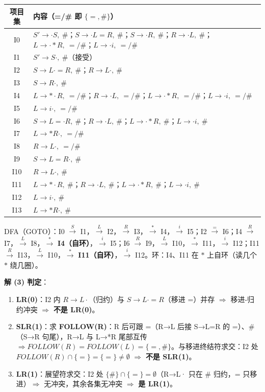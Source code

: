 \documentclass[12pt,a4paper,fontset=windows]{ctexart}
\newcommand{\imp}{\ensuremath{\Rightarrow}}
\begin{document}
\begin{center}
\renewcommand{\arraystretch}{1.25}
\begin{tabular}{c p{11.8cm}}
\toprule
\textbf{项目集} & \textbf{内容（=/\# 即 $\{=,\#\}$）} \\
\midrule
I0 & $S' \to \cdot S,\ \#$；$S \to \cdot L=R,\ \#$；$S \to \cdot R,\ \#$；$R \to \cdot L,\ \#$；$L \to \cdot *R,\ =/\#$；$L \to \cdot i,\ =/\#$ \\
I1 & $S' \to S\cdot,\ \#$（接受） \\
I2 & {\boldmath $S \to L\cdot =R,\ \#$}；{\boldmath $R \to L\cdot,\ \#$} \\
I3 & $S \to R\cdot,\ \#$ \\
I4 & $L \to *\cdot R,\ =/\#$；$R \to \cdot L,\ =/\#$；$L \to \cdot *R,\ =/\#$；$L \to \cdot i,\ =/\#$ \\
I5 & $L \to i\cdot,\ =/\#$ \\
I6 & $S \to L=\cdot R,\ \#$；$R \to \cdot L,\ \#$；$L \to \cdot *R,\ \#$；$L \to \cdot i,\ \#$ \\
I7 & $L \to *R\cdot,\ =/\#$ \\
I8 & $R \to L\cdot,\ =/\#$ \\
I9 & $S \to L=R\cdot,\ \#$ \\
I10 & $R \to L\cdot,\ \#$ \\
I11 & $L \to *\cdot R,\ \#$；$R \to \cdot L,\ \#$；$L \to \cdot *R,\ \#$；$L \to \cdot i,\ \#$ \\
I12 & $L \to i\cdot,\ \#$ \\
I13 & $L \to *R\cdot,\ \#$ \\
\bottomrule
\end{tabular}
\end{center}

DFA（GOTO）：I0 $\xrightarrow{S}$ I1，$\xrightarrow{L}$ I2，$\xrightarrow{R}$ I3，$\xrightarrow{*}$ I4，$\xrightarrow{i}$ I5；I2 $\xrightarrow{=}$ I6；I4 $\xrightarrow{R}$ I7，$\xrightarrow{L}$ I8，$\xrightarrow{*}$ \textbf{I4（自环）}，$\xrightarrow{i}$ I5；I6 $\xrightarrow{R}$ I9，$\xrightarrow{L}$ I10，$\xrightarrow{*}$ I11，$\xrightarrow{i}$ I12；I11 $\xrightarrow{R}$ I13，$\xrightarrow{L}$ I10，$\xrightarrow{*}$ \textbf{I11（自环）}，$\xrightarrow{i}$ I12。环：I4、I11 在 $*$ 上自环（读几个 $*$ 绕几圈）。

\textbf{解 (3) 判定}：
\begin{enumerate}
\item \textbf{LR(0)}：I2 内 $R \to L\cdot$（归约）与 $S \to L\cdot = R$（移进 =）并存 \imp{} 移进-归约冲突 \imp{} \textbf{不是 LR(0)}。
\item \textbf{SLR(1)}：求 \textbf{FOLLOW(R)}：R 后可跟 =（R→L 后接 S→L=R 的 =）、\#（S→R 句尾），R→L 与 L→*R 尾部互传 $\Rightarrow FOLLOW(R)=FOLLOW(L)=\{=,\#\}$。与移进终结符求交：I2 处 $FOLLOW(R) \cap \{=\} = \{=\} \neq \emptyset$ \imp{} \textbf{不是 SLR(1)}。
\item \textbf{LR(1)}：展望符求交：I2 处 $\{\#\} \cap \{=\} = \emptyset$（R→L· 只在 \# 归约，= 只移进）\imp{} 无冲突，其余各集无冲突 \imp{} \textbf{是 LR(1)}。
\end{enumerate}
\end{document}
